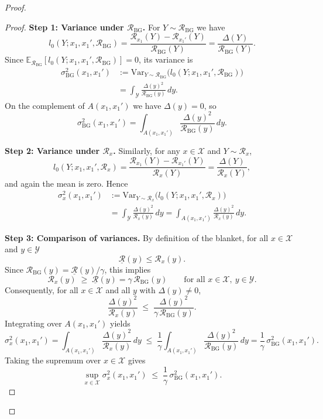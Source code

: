 \documentclass{article}
\theoremstyle{plain}
\theoremstyle{definition}
\begin{document}
\begin{proof}
\begin{proof}
\textbf{Step 1: Variance under $\mathcal R_{\mathrm{BG}}$.}
For $Y\sim\mathcal R_{\mathrm{BG}}$ we have
\[
  l_0(Y;x_1,x_1',\mathcal R_{\mathrm{BG}})
  = \frac{\mathcal R_{x_1}(Y)-\mathcal R_{x_1'}(Y)}
         {\mathcal R_{\mathrm{BG}}(Y)}
  = \frac{\Delta(Y)}{\mathcal R_{\mathrm{BG}}(Y)}.
\]
Since
$\mathbb E_{\mathcal R_{\mathrm{BG}}}[l_0(Y;x_1,x_1',\mathcal R_{\mathrm{BG}})]
= 0$, its variance is
\begin{align*}
  \sigma_{\mathrm{BG}}^2(x_1,x_1')
  &:= \mathrm{Var}_{Y\sim\mathcal R_{\mathrm{BG}}}
      \bigl(l_0(Y;x_1,x_1',\mathcal R_{\mathrm{BG}})\bigr)\\
  &= \int_{\mathcal Y}
       \frac{\Delta(y)^2}{\mathcal R_{\mathrm{BG}}(y)}\,dy.
\end{align*}
On the complement of $A(x_1,x_1')$ we have $\Delta(y)=0$, so
\[
  \sigma_{\mathrm{BG}}^2(x_1,x_1')
  = \int_{A(x_1,x_1')}
      \frac{\Delta(y)^2}{\mathcal R_{\mathrm{BG}}(y)}\,dy.
\]

\textbf{Step 2: Variance under $\mathcal R_x$.}
Similarly, for any $x\in\mathcal X$ and $Y\sim\mathcal R_x$,
\[
  l_0(Y;x_1,x_1',\mathcal R_x)
  = \frac{\mathcal R_{x_1}(Y)-\mathcal R_{x_1'}(Y)}
         {\mathcal R_x(Y)}
  = \frac{\Delta(Y)}{\mathcal R_x(Y)},
\]
and again the mean is zero. Hence
\begin{align*}
  \sigma_x^2(x_1,x_1')
  &:= \mathrm{Var}_{Y\sim\mathcal R_x}
      \bigl(l_0(Y;x_1,x_1',\mathcal R_x)\bigr)\\
  &= \int_{\mathcal Y}
       \frac{\Delta(y)^2}{\mathcal R_x(y)}\,dy
   = \int_{A(x_1,x_1')}
       \frac{\Delta(y)^2}{\mathcal R_x(y)}\,dy.
\end{align*}

\textbf{Step 3: Comparison of variances.}
By definition of the blanket, for all $x\in\mathcal X$ and $y\in\mathcal Y$
\[
  \underline{\mathcal R}(y)
  \le \mathcal R_x(y).
\]
Since
$\mathcal R_{\mathrm{BG}}(y)
 = \underline{\mathcal R}(y)/\gamma$, this implies
\[
  \mathcal R_x(y)
  \;\ge\;
  \underline{\mathcal R}(y)
  = \gamma\,\mathcal R_{\mathrm{BG}}(y)
  \qquad\text{for all }x\in\mathcal X,\ y\in\mathcal Y.
\]
Consequently, for all $x\in\mathcal X$ and all $y$ with $\Delta(y)\neq 0$,
\[
  \frac{\Delta(y)^2}{\mathcal R_x(y)}
  \;\le\;
  \frac{\Delta(y)^2}{\gamma\,\mathcal R_{\mathrm{BG}}(y)}.
\]
Integrating over $A(x_1,x_1')$ yields
\[
  \sigma_x^2(x_1,x_1')
  = \int_{A(x_1,x_1')}
      \frac{\Delta(y)^2}{\mathcal R_x(y)}\,dy
  \;\le\;
  \frac{1}{\gamma}
  \int_{A(x_1,x_1')}
      \frac{\Delta(y)^2}{\mathcal R_{\mathrm{BG}}(y)}\,dy
  = \frac{1}{\gamma}\,\sigma_{\mathrm{BG}}^2(x_1,x_1').
\]
Taking the supremum over $x\in\mathcal X$ gives
\[
  \sup_{x\in\mathcal X} \sigma_x^2(x_1,x_1')
  \;\le\;
  \frac{1}{\gamma}\,\sigma_{\mathrm{BG}}^2(x_1,x_1').
\]


\end{proof}
\end{proof}
\end{document}
